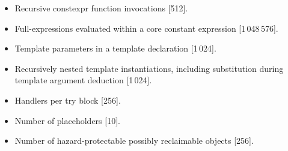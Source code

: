 \begin{itemize}
\item%
Recursive constexpr function invocations [512].
\item%
Full-expressions evaluated within a core constant expression [1\,048\,576].
\item%
Template parameters in a template declaration [1\,024].
\item%
Recursively nested template instantiations, including substitution
during template argument deduction [1\,024].
\item%
Handlers per try block [256].
\item%
Number of placeholders [10].
\item%
Number of hazard-protectable possibly reclaimable objects [256].

\end{itemize}
